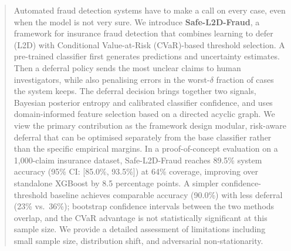 \begin{abstract}
Automated fraud detection systems have to make a call on every case, even when the model is not very sure. We introduce \textbf{Safe-L2D-Fraud}, a framework for insurance fraud detection that combines learning to defer (L2D) with Conditional Value-at-Risk (CVaR)-based threshold selection. A pre-trained classifier first generates predictions and uncertainty estimates. Then a deferral policy sends the most unclear claims to human investigators, while also penalising errors in the worst-$\delta$ fraction of cases the system keeps. The deferral decision brings together two signals, Bayesian posterior entropy and calibrated classifier confidence, and uses domain-informed feature selection based on a directed acyclic graph. We view the primary contribution as the framework design modular, risk-aware deferral that can be optimised separately from the base classifier rather than the specific empirical margins. In a proof-of-concept evaluation on a 1{,}000-claim insurance dataset, Safe-L2D-Fraud reaches 89.5\% system accuracy (95\% CI: [85.0\%, 93.5\%]) at 64\% coverage, improving over standalone XGBoost by 8.5 percentage points. A simpler confidence-threshold baseline achieves comparable accuracy (90.0\%) with less deferral (23\% vs.\ 36\%); bootstrap confidence intervals between the two methods overlap, and the CVaR advantage is not statistically significant at this sample size. We provide a detailed assessment of limitations including small sample size, distribution shift, and adversarial non-stationarity.
\end{abstract}
